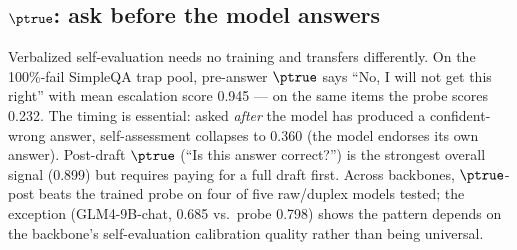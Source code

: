 \subsection{$\ptrue$: ask before the model answers}
\label{sec:ptrue}

Verbalized self-evaluation needs no training and transfers differently. On
the 100\%-fail SimpleQA trap pool, pre-answer $\ptrue$ says ``No, I will not
get this right'' with mean escalation score 0.945 --- on the same items the
probe scores 0.232. The timing is essential: asked \emph{after} the model
has produced a confident-wrong answer, self-assessment collapses to 0.360
(the model endorses its own answer). Post-draft $\ptrue$ (``Is this answer
correct?'') is the strongest overall signal (0.899) but requires paying for
a full draft first. Across backbones, $\ptrue$-post beats the trained probe
on four of five raw/duplex models tested; the exception (GLM4-9B-chat,
0.685 vs.\ probe 0.798) shows the pattern depends on the backbone's
self-evaluation calibration quality rather than being universal.

